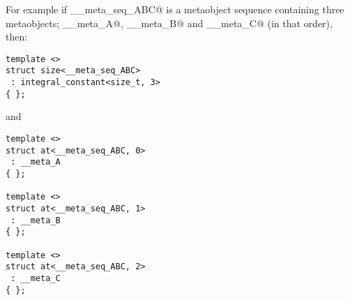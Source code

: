 For example if \verb@__meta_seq_ABC@ is a metaobject sequence containing three metaobjects;
\verb@__meta_A@, \verb@__meta_B@ and \verb@__meta_C@ (in that order), then:

\begin{verbatim}
template <>
struct size<__meta_seq_ABC>
 : integral_constant<size_t, 3>
{ };
\end{verbatim}

and 

\begin{verbatim}
template <>
struct at<__meta_seq_ABC, 0>
 : __meta_A
{ };

template <>
struct at<__meta_seq_ABC, 1>
 : __meta_B
{ };

template <>
struct at<__meta_seq_ABC, 2>
 : __meta_C
{ };
\end{verbatim}

